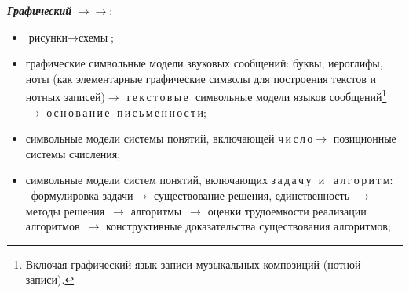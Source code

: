 \begin{multicols}{2}
{{\medskip
{\bfseries\textit{Графический}}\;
$\rightarrow$\;$\rightarrow$:
\smallskip
\begin{itemize}
\item $\mbox{рисунки}\rightarrow\mbox{схемы}$;
\item графические символьные модели звуковых сообщений: буквы,
иероглифы, ноты (как элементарные графические символы для по\-стро\-ения
текстов и нотных записей)\;$\rightarrow$ т\,е\,к\,с\,т\,о\,в\,ы\,е\,\ 
символьные модели языков сообщений\footnote{Включая графический язык записи 
музыкальных композиций (нотной записи).} $\rightarrow$ 
о\,с\,н\,о\,в\,а\,н\,и\,е\,\ п\,и\,с\,ь\,м\,е\,н\,н\,о\,с\,т\,и;
\item символьные модели системы понятий, включающей
ч\,и\,с\,л\,о\;$\rightarrow$ позиционные системы счисления;
\item символьные модели систем понятий, включающих з\,а\,д\,а\,ч\,у\,\ и\,\,\
а\,л\,г\,о\,р\,и\,т\,м:\,\ формулировка задачи\;$\rightarrow$ существование
решения, единственность~$\rightarrow$ методы решения~$\rightarrow$
алгоритмы~$\rightarrow$ оценки трудоемкости реализации алгоритмов~$\rightarrow$ 
конструктивные доказательства существования алгоритмов;


\end{itemize}}}
\end{multicols}
